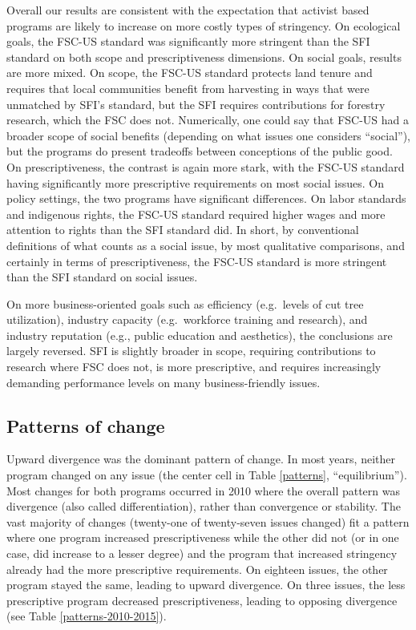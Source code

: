 \documentclass[
      12pt,
            Review ]{article}
\begin{document}
Overall our results are consistent with the expectation that activist
based programs are likely to increase on more costly types of
stringency. On ecological goals, the FSC-US standard was significantly
more stringent than the SFI standard on both scope and prescriptiveness
dimensions. On social goals, results are more mixed. On scope, the
FSC-US standard protects land tenure and requires that local communities
benefit from harvesting in ways that were unmatched by SFI's standard,
but the SFI requires contributions for forestry research, which the FSC
does not. Numerically, one could say that FSC-US had a broader scope of
social benefits (depending on what issues one considers ``social''), but
the programs do present tradeoffs between conceptions of the public
good. On prescriptiveness, the contrast is again more stark, with the
FSC-US standard having significantly more prescriptive requirements on
most social issues. On policy settings, the two programs have
significant differences. On labor standards and indigenous rights, the
FSC-US standard required higher wages and more attention to rights than
the SFI standard did. In short, by conventional definitions of what
counts as a social issue, by most qualitative comparisons, and certainly
in terms of prescriptiveness, the FSC-US standard is more stringent than
the SFI standard on social issues.

On more business-oriented goals such as efficiency (e.g.~levels of cut
tree utilization), industry capacity (e.g.~workforce training and
research), and industry reputation (e.g., public education and
aesthetics), the conclusions are largely reversed. SFI is slightly
broader in scope, requiring contributions to research where FSC does
not, is more prescriptive, and requires increasingly demanding
performance levels on many business-friendly issues.

\subsection{Patterns of change}\label{patterns-of-change}

Upward divergence was the dominant pattern of change. In most years,
neither program changed on any issue (the center cell in Table
\ref{patterns}, ``equilibrium''). Most changes for both programs
occurred in 2010 where the overall pattern was divergence (also called
differentiation), rather than convergence or stability. The vast
majority of changes (twenty-one of twenty-seven issues changed) fit a
pattern where one program increased prescriptiveness while the other did
not (or in one case, did increase to a lesser degree) and the program
that increased stringency already had the more prescriptive
requirements. On eighteen issues, the other program stayed the same,
leading to upward divergence. On three issues, the less prescriptive
program decreased prescriptiveness, leading to opposing divergence (see
Table \ref{patterns-2010-2015}).
\end{document}
